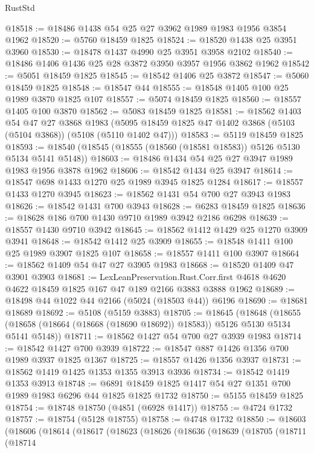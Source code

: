 \begin{lexlean}{RustStd}
\begin{coremodule}
@18518 := @18486 @1438 @54 @25 @27 @3962 @1989 @1983 @1956 @3854 @1962
@18520 := @5760 @18459 @1825
@18524 := @18520 @1438 @25 @3951 @3960
@18530 := @18478 @1437 @4990 @25 @3951 @3958 @2102
@18540 := @18486 @1406 @1436 @25 @28 @3872 @3950 @3957 @1956 @3862 @1962
@18542 := @5051 @18459 @1825
@18545 := @18542 @1406 @25 @3872
@18547 := @5060 @18459 @1825
@18548 := @18547 @44
@18555 := @18548 @1405 @100 @25 @1989 @3870 @1825 @107
@18557 := @5074 @18459 @1825
@18560 := @18557 @1405 @100 @3870
@18562 := @5083 @18459 @1825
@18581 := @18562
    @1403
    @54
    @47
    @27
    @3868
    @1983
    (@5095 @18459 @1825 @47 @1402 @3868 (@5103 (@5104 @3868)) (@5108 (@5110 @1402 @47)))
@18583 := @5119 @18459 @1825
@18593 := @18540 (@18545 (@18555 (@18560 (@18581 @18583)) @5126 @5130 @5134 @5141 @5148))
@18603 := @18486 @1434 @54 @25 @27 @3947 @1989 @1983 @1956 @3878 @1962
@18606 := @18542 @1434 @25 @3947
@18614 := @18547 @698 @1433 @1270 @25 @1989 @3945 @1825 @1284
@18617 := @18557 @1433 @1270 @3945
@18623 := @18562 @1431 @54 @700 @27 @3943 @1983
@18626 := @18542 @1431 @700 @3943
@18628 := @6283 @18459 @1825
@18636 := @18628 @186 @700 @1430 @9710 @1989 @3942 @2186 @6298
@18639 := @18557 @1430 @9710 @3942
@18645 := @18562 @1412 @1429 @25 @1270 @3909 @3941
@18648 := @18542 @1412 @25 @3909
@18655 := @18548 @1411 @100 @25 @1989 @3907 @1825 @107
@18658 := @18557 @1411 @100 @3907
@18664 := @18562 @1409 @54 @47 @27 @3905 @1983
@18668 := @18520 @1409 @47 @3901 @3903
@18681 := LexLeanPreservation.Rust.Corr.first
    @4618
    @4620
    @4622
    @18459
    @1825
    @167
    @47
    @189
    @2166
    @3883
    @3888
    @1962
@18689 := @18498 @44 @1022 @44 @2166 (@5024 (@18503 @44)) @6196
@18690 := @18681 @18689
@18692 := @5108 (@5159 @3883)
@18705 := @18645
    (@18648
      (@18655 (@18658 (@18664 (@18668 (@18690 @18692)) @18583)) @5126 @5130 @5134 @5141 @5148))
@18711 := @18562 @1427 @54 @700 @27 @3939 @1983
@18714 := @18542 @1427 @700 @3939
@18722 := @18547 @887 @1426 @1356 @700 @1989 @3937 @1825 @1367
@18725 := @18557 @1426 @1356 @3937
@18731 := @18562 @1419 @1425 @1353 @1355 @3913 @3936
@18734 := @18542 @1419 @1353 @3913
@18748 := @6891 @18459 @1825 @1417 @54 @27 @1351 @700 @1989 @1983 @6296 @44 @1825 @1825 @1732
@18750 := @5155 @18459 @1825
@18754 := @18748 @18750 (@4851 (@6928 @1417))
@18755 := @4724 @1732
@18757 := @18754 (@5128 @18755)
@18758 := @4748 @1732
@18850 := @18603
    (@18606
      (@18614
        (@18617
          (@18623
            (@18626
              (@18636
                (@18639
                  (@18705
                    (@18711
                      (@18714

\end{coremodule}
\end{lexlean}
